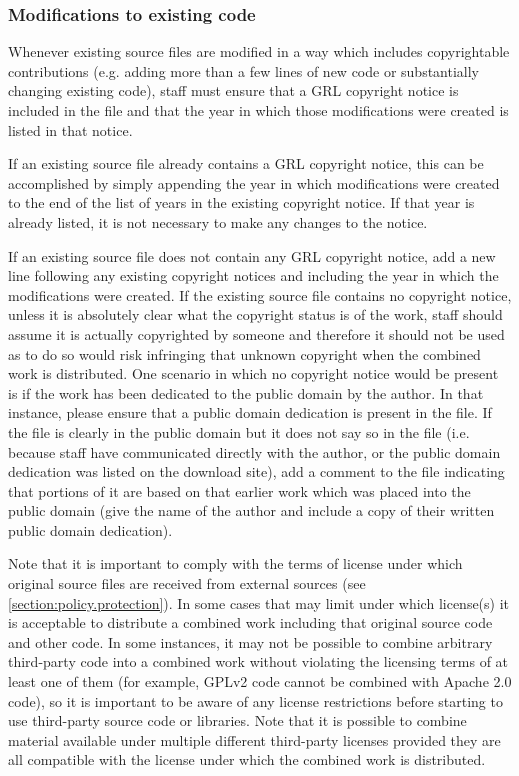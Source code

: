 \documentclass[10pt,a4paper]{article}
\begin{document}
\subsubsection{Modifications to existing code}
\par Whenever existing source files are modified in a way which includes copyrightable 
contributions (e.g. adding more than a few lines of new code or substantially changing 
existing code), staff must ensure that a GRL copyright notice is included in the file 
and that the year in which those modifications were created is listed in that notice. 

\par If an existing source file already contains a GRL copyright notice, this can be 
accomplished by simply appending the year in which modifications were created 
to the end of the list of years in the existing copyright notice. If that year is already 
listed, it is not necessary to make any changes to the notice. 

\par If an existing source file does not contain any GRL copyright notice, add a 
new line following any existing copyright notices and including the year in which 
the modifications were created. If the existing source file contains no copyright 
notice, unless it is absolutely clear what the copyright status is of the work, staff 
should assume it is actually copyrighted by someone and therefore it should not 
be used as to do so would risk infringing that unknown copyright when the 
combined work is distributed. One scenario in which no copyright notice would be 
present is if the work has been dedicated to the public domain by the author. In 
that instance, please ensure that a public domain dedication is present in the file. 
If the file is clearly in the public domain but it does not say so in the file (i.e. because 
staff have communicated directly with the author, or the public domain dedication was 
listed on the download site), add a comment to the file indicating that portions of it 
are based on that earlier work which was placed into the public domain (give the 
name of the author and include a copy of their written public domain dedication). 

\par Note that it is important to comply with the terms of license under 
which original source files are received from external sources (see 
\ref{section:policy.protection}). In some cases that may limit 
under which license(s) it is acceptable to distribute a combined work  
including that original source code and other code. In some instances, it may not  
be possible to combine arbitrary third-party code into a combined work without 
violating the licensing terms of at least one of them (for example, GPLv2 code 
cannot be combined with Apache 2.0 code), so it is important to be aware 
of any license restrictions before starting to use third-party source code or libraries. 
Note that it is possible to combine material available under multiple different 
third-party licenses provided they are all compatible with the license under which 
the combined work is distributed.
\end{document}
